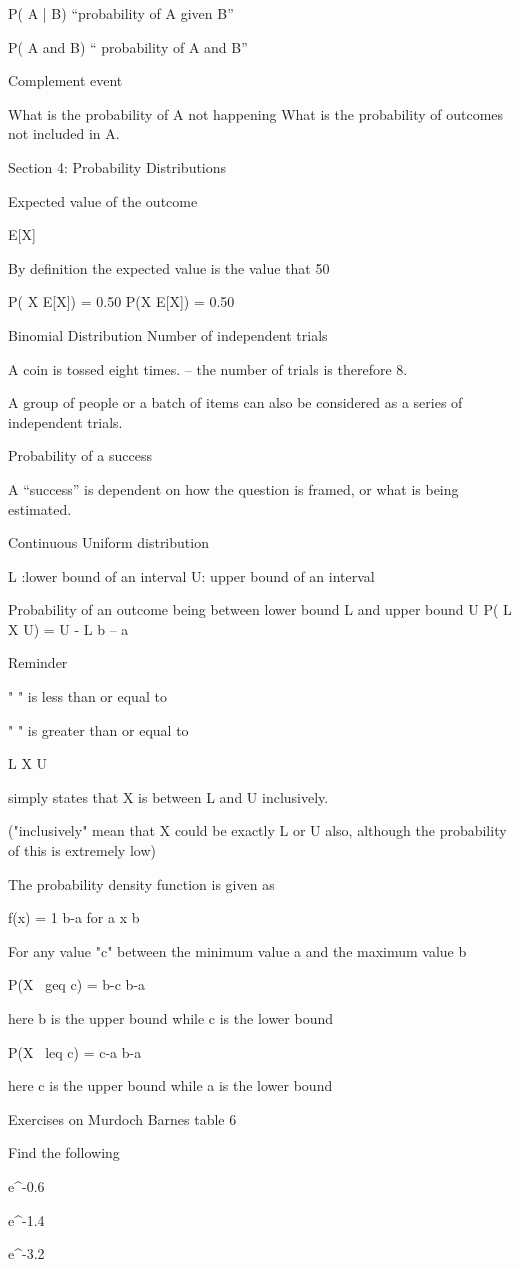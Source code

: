 P( A | B)  “probability of A given B”
 
P( A and B) “ probability of A and B”
 
Complement event
 
What is the probability of A not happening
What is the probability of outcomes not included in A.
 
Section 4: Probability Distributions
 
Expected value of the outcome
 
E[X]
 
By definition the expected value is the value that 50%
 
P( X \geq E[X])  = 0.50  P(X \leq E[X]) = 0.50
 
Binomial Distribution
Number of independent trials
 
A coin is tossed eight times. – the number of trials is therefore 8.
 
A group of people or a batch of items can also be considered as a series of independent trials.
 
Probability of a success
 
A “success” is dependent on how the question is framed, or what is being estimated.
 
Continuous Uniform distribution
 
L :lower bound of an interval
U: upper bound of an interval
 
Probability of an outcome being between lower bound L and upper bound U
P( L \leq X \leq U)  =  { U - L \over  b – a }
 
 
Reminder
 
" \leq" is less than or equal to
 
" \geq" is greater than or equal to
 
 
L \leq X \leq U
 
simply states that X is between L and U inclusively.
 
("inclusively" mean that X could be exactly L or U also, although the probability of this is extremely low)
 
 
The probability density function is given as
 
f(x) = {1 \over b-a} for a \leq x \leq b
 
For any value "c" between the minimum value a and the maximum value b
 
P(X \ geq c) = {b-c \over b-a}
 
here b is the upper bound while c is the lower bound
 
 
P(X \ leq c) = {c-a \over b-a}
 
here c is the upper bound while a is the lower bound
 
 
 
Exercises on Murdoch Barnes table 6
 
Find the following
 
e^{-0.6}
 
e^{-1.4}
 
e^{-3.2}

